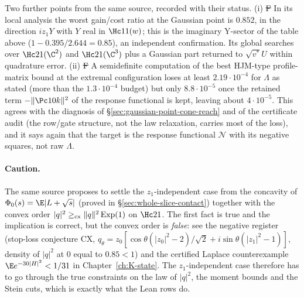 Two further points from the same source, recorded with their status.
(i) \st{F} In its local analysis the worst gain/cost ratio at the
Gaussian point is $0.852$, in the direction $iz_1Y$ with $Y$ real in
$\Hc11(w)$; this is the imaginary Y-sector of the table above
($1-0.395/2.644=0.85$), an independent confirmation. Its global searches
over $\Hc21(\C^2)$ and $\Hc21(\C^3)$ plus a Gaussian part returned to
$\sqrt{v^*}U$ within quadrature error. (ii) \st{F} A semidefinite
computation of the best HJM-type profile-matrix bound at the extremal
configuration loses at least $2.19\cdot10^{-4}$ for $\Lambda$ as stated
(more than the $1.3\cdot10^{-4}$ budget) but only $8.8\cdot10^{-5}$ once
the retained term $-\|\Pc10k\|^2$ of the response functional is kept,
leaving about $4\cdot10^{-5}$. This agrees with the diagnosis of
\S\ref{sec:gaussian-point-cone-reach} and of the certificate audit
(the row/gate structure, not the law relaxation, carries most of the
loss), and it says again that the target is the response functional
$\mathcal N$ with its negative squares, not raw $\Lambda$.

\paragraph{Caution.} The same source proposes to settle the
$z_1$-independent case from the concavity of $\Phi_0(s)=\E|L+\sqrt s|$
(proved in \S\ref{sec:whole-slice-contact}) together with the convex
order $|q|^2\ge_{\rm cx}\|q\|^2\,\mathrm{Exp}(1)$ on $\Hc21$. The
first fact is true and the implication is correct, but the convex order
is \emph{false}: see the negative register (stop-loss conjecture CX,
$q_\theta=z_0[\cos\theta(|z_0|^2-2)/\sqrt2+i\sin\theta(|z_1|^2-1)]$,
density of $|q|^2$ at $0$ equal to $0.85<1$) and the certified Laplace
counterexample $\E e^{-30|H|^2}<1/31$ in Chapter~\ref{ch:K-state}. The
$z_1$-independent case therefore has to go through the true constraints
on the law of $|q|^2$, the moment bounds and the Stein cuts, which is
exactly what the Lean rows do.



